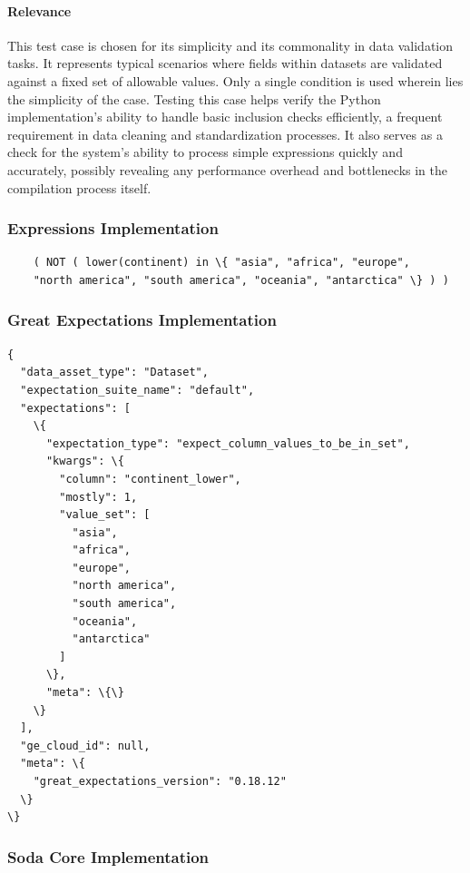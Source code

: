 \paragraph{Relevance} This test case is chosen for its simplicity and its commonality in data validation tasks. It represents typical scenarios where fields within datasets are validated against a fixed set of allowable values.  Only a single condition is used wherein lies the simplicity of the case. Testing this case helps verify the Python implementation’s ability to handle basic inclusion checks efficiently, a frequent requirement in data cleaning and standardization processes. It also serves as a check for the system’s ability to process simple expressions quickly and accurately, possibly revealing any performance overhead and bottlenecks in the compilation process itself.

\subsubsection{Expressions Implementation}

\begin{verbatim}
    ( NOT ( lower(continent) in \{ "asia", "africa", "europe", 
    "north america", "south america", "oceania", "antarctica" \} ) )
\end{verbatim}

\subsubsection{Great Expectations Implementation}

\begin{verbatim}
{
  "data_asset_type": "Dataset",
  "expectation_suite_name": "default",
  "expectations": [
    \{
      "expectation_type": "expect_column_values_to_be_in_set",
      "kwargs": \{
        "column": "continent_lower",
        "mostly": 1,
        "value_set": [
          "asia",
          "africa",
          "europe",
          "north america",
          "south america",
          "oceania",
          "antarctica"
        ]
      \},
      "meta": \{\}
    \}
  ],
  "ge_cloud_id": null,
  "meta": \{
    "great_expectations_version": "0.18.12"
  \}
\}
\end{verbatim}

\subsubsection{Soda Core Implementation}

